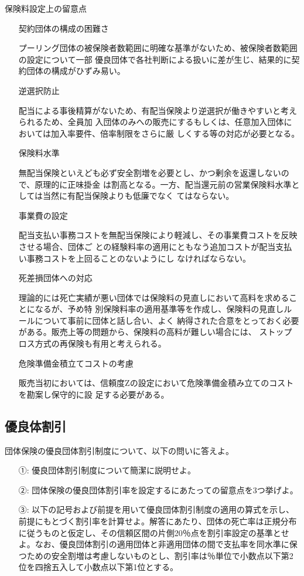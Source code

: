 \documentclass[report,gutter=10mm,fore-edge=10mm,uplatex,dvipdfmx]{jlreq}
\begin{document}
\begin{itemize}
\begin{itemize}
\end{itemize}
 保険料設定上の留意点
\begin{itemize}
\item[]契約団体の構成の困難さ\par
 プーリング団体の被保険者数範囲に明確な基準がないため、被保険者数範囲の設定について一部
 優良団体で各社判断による扱いに差が生じ、結果的に契約団体の構成がひずみ易い。
\item[]逆選択防止\par
 配当による事後精算がないため、有配当保険より逆選択が働きやすいと考えられるため、全員加
 入団体のみへの販売にするもしくは、任意加入団体においては加入率要件、倍率制限をさらに厳
 しくする等の対応が必要となる。
\item[]保険料水準\par
 無配当保険といえども必ず安全割増を必要とし、かつ剰余を返還しないので、原理的に正味掛金
 は割高となる。一方、配当還元前の営業保険料水準としては当然に有配当保険よりも低廉でなく
 てはならない。
\item[]事業費の設定\par
 配当支払い事務コストを無配当保険により軽減し、その事業費コストを反映させる場合、団体ご
 との経験料率の適用にともなう追加コストが配当支払い事務コストを上回ることのないようにし
 なければならない。
\item[]死差損団体への対応\par
 理論的には死亡実績が悪い団体では保険料の見直しにおいて高料を求めることになるが、予め特
 別保険料率の適用基準等を作成し、保険料の見直しルールについて事前に団体と話し合い、よく
 納得された合意をとっておく必要がある。販売上等の問題から、保険料の高料が難しい場合には、
 ストップロス方式の再保険も有用と考えられる。
\item[]危険準備金積立てコストの考慮\par
 販売当初においては、信頼度Zの設定において危険準備金積み立てのコストを勘案し保守的に設
 足する必要がある。
\end{itemize}
\end{itemize}
\subsection{優良体割引}

団体保険の優良団体割引制度について、以下の問いに答えよ。

\begin{itemize}
\item[ ①: ]  優良団体割引制度について簡潔に説明せよ。
\item[ ②: ]  団体保険の優良団体割引率を設定するにあたっての留意点を3つ挙げよ。
\item[ ③: ]  以下の記号および前提を用いて優良団体割引制度の適用の算式を示し、前提にもとづく割引率を計算せよ。解答にあたり、団体の死亡率は正規分布に従うものと仮定し、その信頼区間の片側20％点を割引率設定の基準とせよ。なお、優良団体割引の適用団体と非適用団体の間で支払率を同水準に保つための安全割増は考慮しないものとし、割引率は％単位で小数点以下第2位を四捨五入して小数点以下第1位とする。
\end{itemize}
\end{document}
